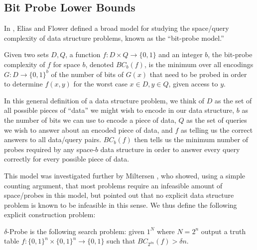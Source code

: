 \subsection{Bit Probe Lower Bounds}\label{range:subsec:bit-probe-lower-bounds}
In \cite{Elias-Flower}, Elias and Flower defined a broad model for studying the space/query complexity of data structure problems, known as the ``bit-probe model.'' 
\begin{definition}\label{range:def:bit-probe-complexity}
Given two sets $D,Q$, a function $f: D \times Q \rightarrow \{0,1\}$ and an integer $b$, the bit-probe complexity of $f$ for space $b$, denoted $BC_b(f)$, is the minimum over all encodings $G: D \rightarrow \{0,1\}^b$ of the number of bits of $G(x)$ that need to be probed in order to determine $f(x,y)$ for the worst case $x \in D,y \in Q$, given access to $y$.
\end{definition}
In this general definition of a data structure problem, we think of $D$ as the set of all possible pieces of ``data'' we might wish to encode in our data structure, $b$ as the number of bits we can use to encode a piece of data, $Q$ as the set of queries we wish to answer about an encoded piece of data, and $f$ as telling us the correct answers to all data/query pairs. $BC_b(f)$ then tells us the minimum number of probes required by any space-$b$ data structure in order to answer every query correctly for every possible piece of data.

This model was investigated further by Miltersen \cite{Bro}, who showed, using a simple counting argument, that most problems require an infeasible amount of space/probes in this model, but pointed out that no explicit data structure problem is known to be infeasible in this sense. We thus define the following explicit construction problem:
\begin{definition}\label{range:def:delta-probe}
{\sc $\delta$-Probe} is the following search problem: given $1^N$ where $N = 2^n$ output a truth table $f: \{0,1\}^n \times \{0,1\}^n \rightarrow \{0,1\}$ such that $BC_{2^{\delta n}}(f) > \delta n$.
\end{definition}

